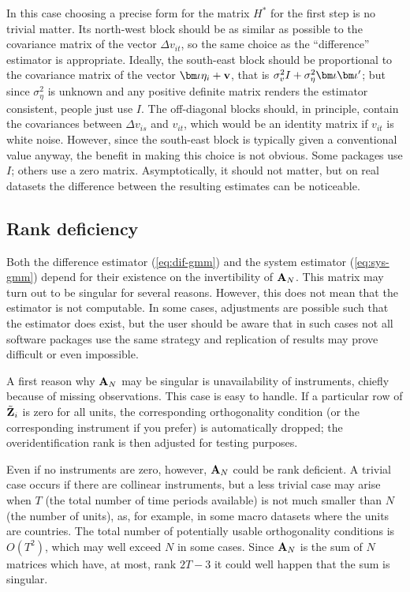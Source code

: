 In this case choosing a precise form for the matrix $H^*$ for the
first step is no trivial matter. Its north-west block should be as
similar as possible to the covariance matrix of the vector $\Delta
v_{it}$, so the same choice as the ``difference'' estimator is
appropriate. Ideally, the south-east block should be proportional to
the covariance matrix of the vector $\biota \eta_i + \bv$, that is
$\sigma^2_{v} I + \sigma^2_{\eta} \biota \biota'$; but since
$\sigma^2_{\eta}$ is unknown and any positive definite matrix renders
the estimator consistent, people just use $I$. The off-diagonal blocks
should, in principle, contain the covariances between $\Delta v_{is}$
and $v_{it}$, which would be an identity matrix if $v_{it}$ is white
noise. However, since the south-east block is typically given a
conventional value anyway, the benefit in making this choice is not
obvious. Some packages use $I$; others use a zero matrix.
Asymptotically, it should not matter, but on real datasets the
difference between the resulting estimates can be noticeable.

\subsection{Rank deficiency}
\label{sec:rankdef}

Both the difference estimator (\ref{eq:dif-gmm}) and the system
estimator (\ref{eq:sys-gmm}) depend for their existence on the
invertibility of $\mathbf{A}_N$. This matrix may turn out to be singular for
several reasons. However, this does not mean that the estimator is not
computable. In some cases, adjustments are possible such that the
estimator does exist, but the user should be aware that in such cases
not all software packages use the same strategy and replication of
results may prove difficult or even impossible.

A first reason why $\mathbf{A}_N$ may be singular is unavailability of
instruments, chiefly because of missing observations. This case is
easy to handle. If a particular row of $\tilde{\mathbf{Z}}_i$ is zero for all
units, the corresponding orthogonality condition (or the corresponding
instrument if you prefer) is automatically dropped; the
overidentification rank is then adjusted for testing purposes.

Even if no instruments are zero, however, $\mathbf{A}_N$ could be rank
deficient. A trivial case occurs if there are collinear instruments,
but a less trivial case may arise when $T$ (the total number of time
periods available) is not much smaller than $N$ (the number of units),
as, for example, in some macro datasets where the units are
countries. The total number of potentially usable orthogonality
conditions is $O(T^2)$, which may well exceed $N$ in some cases. Since
$\mathbf{A}_N$ is the sum of $N$ matrices which have, at most, rank $2T -
3$ it could well happen that the sum is singular.

